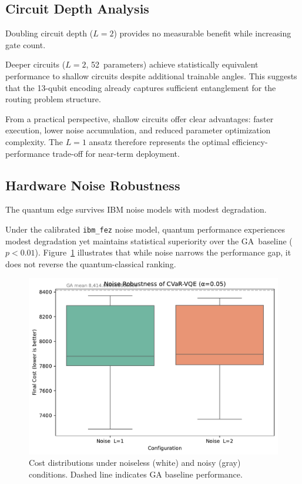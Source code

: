 \subsection{Circuit Depth Analysis}

Doubling circuit depth ($L=2$) provides no measurable benefit while increasing 
gate count.

Deeper circuits ($L=2$, 52~parameters) achieve statistically 
equivalent performance to shallow circuits despite additional trainable angles. 
This suggests that the 13-qubit encoding already captures sufficient entanglement 
for the routing problem structure.

From a practical perspective, shallow circuits offer clear advantages: faster 
execution, lower noise accumulation, and reduced parameter optimization complexity. 
The $L=1$ ansatz therefore represents the optimal efficiency-performance trade-off 
for near-term deployment.

\subsection{Hardware Noise Robustness}

The quantum edge survives IBM noise models with modest degradation.

Under the calibrated \texttt{ibm\_fez} noise model, quantum performance 
experiences modest degradation yet maintains statistical superiority 
over the GA~baseline ($p<0.01$). Figure~\ref{fig:noise} illustrates that while 
noise narrows the performance gap, it does not reverse the quantum-classical ranking.

\begin{figure}[h]
  \centering
  \includegraphics[width=.7\linewidth]{fig/noise_boxplot.pdf}
  \caption{Cost distributions under noiseless (white) and noisy (gray) conditions. 
           Dashed line indicates GA baseline performance.}
  \label{fig:noise}
\end{figure}

